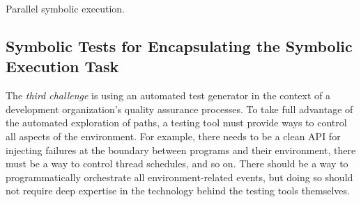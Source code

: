 
Parallel symbolic execution.

\subsection{Symbolic Tests for Encapsulating the Symbolic Execution Task}

The {\em third challenge} is using an automated test generator in the context of a development organization's quality assurance processes.  To take full advantage of the automated exploration of paths, a testing tool must provide ways to control all aspects of the environment.  For example, there needs to be a clean API for injecting failures at the boundary between programs and their environment, there must be a way to control thread schedules, and so on.  There should be a way to programmatically orchestrate all environment-related events, but doing so should not require deep expertise in the technology behind the testing tools themselves.

\fi

